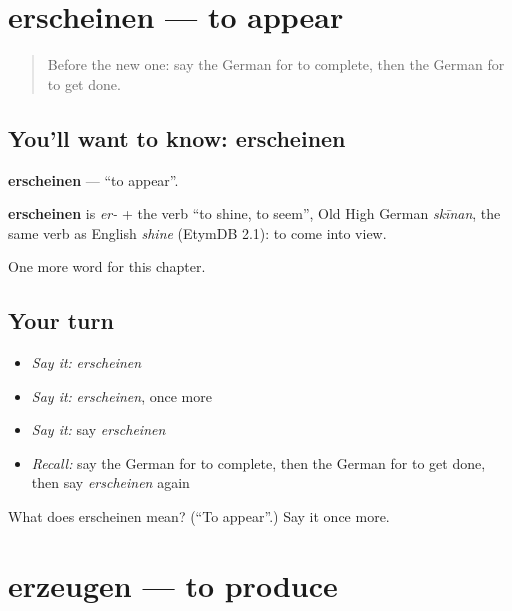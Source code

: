 \section[erscheinen]{erscheinen — to appear}

\label{lesson:GE-C249-erscheinen}



\begin{quote}
Before the new one: say the German for to complete, then the German for to get done.
\end{quote}

\subsection*{You'll want to know: erscheinen}
\textbf{erscheinen} — \textquotedblleft{}to appear\textquotedblright{}.

\begin{cousinweb}
\textbf{erscheinen} is \emph{er-} + the verb \textquotedblleft{}to shine, to seem\textquotedblright{}, Old High German \emph{skīnan}, the same verb as English \emph{shine} (EtymDB 2.1): to come into view.
\end{cousinweb}

\begin{grammarlens}[title={What you've built}]
One more word for this chapter.
\end{grammarlens}

\subsection*{Your turn}
\begin{itemize}
\raggedright
  \item \emph{Say it:} \emph{erscheinen}
  \item \emph{Say it:} \emph{erscheinen}, once more
  \item \emph{Say it:} say \emph{erscheinen}
  \item \emph{Recall:} say the German for to complete, then the German for to get done, then say \emph{erscheinen} again
\end{itemize}

\begin{tcolorbox}[breakable,colback=teal!4,colframe=teal!35!black,title={Before you move on}]
What does erscheinen mean? (\textquotedblleft{}To appear\textquotedblright{}.) Say it once more.
\end{tcolorbox}
\section[erzeugen]{erzeugen — to produce}

